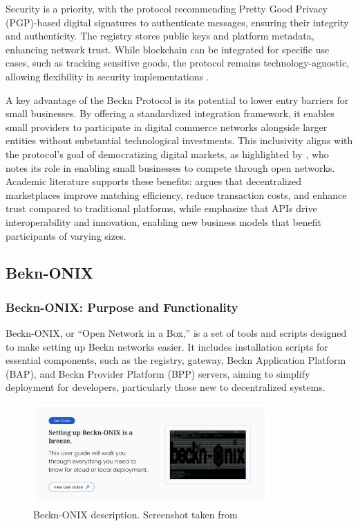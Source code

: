 Security is a priority, with the protocol recommending Pretty Good Privacy (PGP)-based digital signatures to authenticate messages, ensuring their integrity and authenticity. The registry stores public keys and platform metadata, enhancing network trust. While blockchain can be integrated for specific use cases, such as tracking sensitive goods, the protocol remains technology-agnostic, allowing flexibility in security implementations \citep{beckn_video_overview}.

A key advantage of the Beckn Protocol is its potential to lower entry barriers for small businesses. By offering a standardized integration framework, it enables small providers to participate in digital commerce networks alongside larger entities without substantial technological investments. This inclusivity aligns with the protocol’s goal of democratizing digital markets, as highlighted by \citet{yerkade_beckn}, who notes its role in enabling small businesses to compete through open networks. Academic literature supports these benefits: \citet{subramanian_2018} argues that decentralized marketplaces improve matching efficiency, reduce transaction costs, and enhance trust compared to traditional platforms, while \citet{ofoeda_boateng_2019} emphasize that APIs drive interoperability and innovation, enabling new business models that benefit participants of varying sizes.

\subsection{Bekn-ONIX}
\label{beckn_onix}
\subsubsection{Beckn-ONIX: Purpose and Functionality}
\label{onix_purpose}
Beckn-ONIX, or “Open Network in a Box,” is a set of tools and scripts designed to make setting up Beckn networks easier. It includes installation scripts for essential components, such as the registry, gateway, Beckn Application Platform (BAP), and Beckn Provider Platform (BPP) servers, aiming to simplify deployment for developers, particularly those new to decentralized systems.

\begin{figure}[h!]
    \centering
    \includegraphics[width=0.8\textwidth]{Images/Beckn_Onix.png}
    \caption{Beckn-ONIX description. Screenshot taken from \cite{beckn_onix}}
    \label{fig:beckn_onix_picture}
\end{figure}

